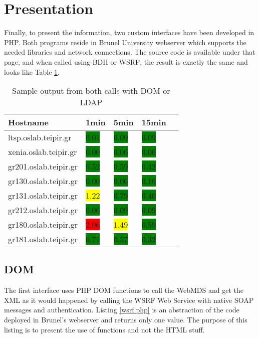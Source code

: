 \section{Presentation}

Finally, to present the information, two custom interfaces have been developed in PHP. Both programs reside in Brunel University webserver which supports the needed libraries and network connections. The source code is available under that page, and when called using BDII or WSRF, the result is exactly the same and looks like Table \ref{tab:html_output}.

\begin{table}[ht]
\centering
\begin{tabular}{ | l | l | l | l | l |}
\hline
 Hostname & 1min & 5min & 15min \\ \hline
 ltsp.oslab.teipir.gr & \colorbox{green}{0.01} & \colorbox{green}{0.09} & \colorbox{green}{0.09} \\ \hline
 xenia.oslab.teipir.gr & \colorbox{green}{0.00} & \colorbox{green}{0.06} & \colorbox{green}{0.06} \\ \hline
 gr201.oslab.teipir.gr & \colorbox{green}{0.52} & \colorbox{green}{0.59} & \colorbox{green}{0.42} \\ \hline
 gr130.oslab.teipir.gr & \colorbox{green}{0.00} & \colorbox{green}{0.06} & \colorbox{green}{0.16} \\ \hline
 gr131.oslab.teipir.gr & \colorbox{yellow}{1.22} & \colorbox{green}{0.79} & \colorbox{green}{0.40} \\ \hline
 gr212.oslab.teipir.gr & \colorbox{green}{0.06} & \colorbox{green}{0.09} & \colorbox{green}{0.09} \\ \hline
 gr180.oslab.teipir.gr & \colorbox{red}{2.06} & \colorbox{yellow}{1.49} & \colorbox{green}{0.59} \\ \hline
 gr181.oslab.teipir.gr & \colorbox{green}{0.71} & \colorbox{green}{0.57} & \colorbox{green}{0.32} \\ \hline
\end{tabular}
\caption{Sample output from both calls with DOM or LDAP}
\label{tab:html_output}
\end{table}

\subsection{DOM}

The first interface uses PHP DOM functions to call the WebMDS and get the XML as it would happened by calling the WSRF Web Service with native SOAP messages and authentication. Listing \ref{wsrf.php} is an abstraction of the code deployed in Brunel's webserver and returns only one value. The purpose of this listing is to present the use of functions and not the HTML stuff.

